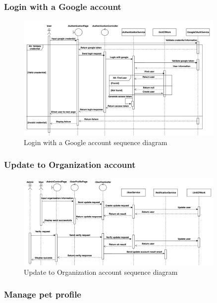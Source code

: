 \subsubsection{Login with a Google account}

\begin{figure}[H]
    \centering
    \includegraphics[width=0.9\textwidth]{Figures/login_gg_seq.png}
    \caption{Login with a Google account sequence diagram}
    \label{fig:login-google-seq}
\end{figure}

\subsubsection{Update to Organization account}

\begin{figure}[H]
    \centering
    \includegraphics[width=0.9\textwidth]{Figures/update_org_seq.png}
    \caption{Update to Organization account sequence diagram}
    \label{fig:update-org-seq}
\end{figure}

\subsubsection{Manage pet profile}

